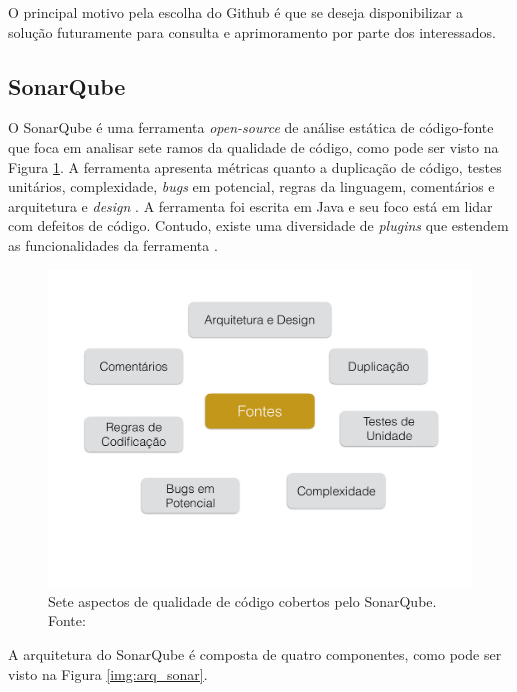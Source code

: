 O principal motivo pela escolha do Github é que se deseja disponibilizar a solução futuramente para consulta e aprimoramento por parte dos interessados. 		

	\subsection{SonarQube}
	\label{sub:sonarqube}
	O SonarQube é uma ferramenta \textit{open-source} de análise estática de código-fonte que foca em analisar sete ramos da qualidade de código, como pode ser visto na Figura \ref{img:sonar}. A ferramenta apresenta métricas quanto a duplicação de código, testes unitários, complexidade, \textit{bugs} em potencial, regras da linguagem, comentários e arquitetura e \textit{design} \cite{sonar}. A ferramenta foi escrita em Java e seu foco está em lidar com defeitos de código. Contudo, existe uma diversidade de \textit{plugins} que estendem as funcionalidades da ferramenta \cite{ferenc_source_2014}.
\graphicspath{{figuras/}}
\begin{figure}[h]
\centering
\includegraphics[scale=0.5]{Sonar}
\caption{Sete  aspectos de qualidade de código cobertos pelo SonarQube. Fonte: \cite{sonar}}
\label{img:sonar}
\end{figure}
A arquitetura do SonarQube é composta de quatro componentes, como pode ser visto na Figura \ref{img:arq_sonar}\cite{sonar}.
